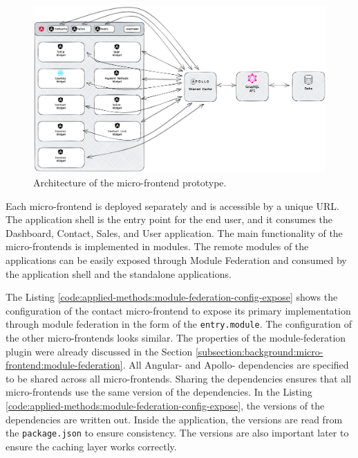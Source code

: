 \ifshowImages
\begin{figure}[H]
    \centering
    \includegraphics[width=1\linewidth]{images/applied-methods/prototypical-implementation/host-architecture.png}
    \caption{Architecture of the micro-frontend prototype.}\label{fig:applied-methods:prototype-micro-frontend-architecture}
\end{figure}
\fi

\noindent Each micro-frontend is deployed separately and is accessible by a unique \ac{URL}. The application shell is the entry point for the end user, and it consumes the Dashboard, Contact, Sales, and User application. The main functionality of the micro-frontends is implemented in modules. The remote modules of the applications can be easily exposed through Module Federation and consumed by the application shell and the standalone applications.

\bigskip

\noindent The Listing \ref{code:applied-methods:module-federation-config-expose} shows the configuration of the contact micro-frontend to expose its primary implementation through module federation in the form of the \texttt{entry.module}. The configuration of the other micro-frontends looks similar. The properties of the module-federation plugin were already discussed in the Section \ref{subsection:background:micro-frontend:module-federation}. All Angular- and Apollo- dependencies are specified to be shared across all micro-frontends. Sharing the dependencies ensures that all micro-frontends use the same version of the dependencies. In the Listing \ref{code:applied-methods:module-federation-config-expose}, the versions of the dependencies are written out. Inside the application, the versions are read from the \texttt{package.json} to ensure consistency. The versions are also important later to ensure the caching layer works correctly.

